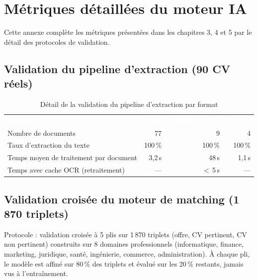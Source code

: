 \documentclass[12pt,a4paper]{report}
\begin{document}
\newpage

\appendix

\chapter{Métriques détaillées du moteur IA}

Cette annexe complète les métriques présentées dans les chapitres 3, 4 et 5 par le détail des protocoles de validation.

\section{Validation du pipeline d'extraction (90 CV réels)}

\begin{table}[H]
\centering
\caption{Détail de la validation du pipeline d'extraction par format}
\label{tab:annexe-extraction}
\small
\begin{tabularx}{\textwidth}{X r r r}
\rowcolor{tabheader}
\textcolor{white}{\textbf{Indicateur}} & \textcolor{white}{\textbf{PDF}} & \textcolor{white}{\textbf{Images (OCR)}} & \textcolor{white}{\textbf{DOCX}} \\
Nombre de documents & 77 & 9 & 4 \\
\rowcolor{tabalt}
Taux d'extraction du texte & 100\,\% & 100\,\% & 100\,\% \\
Temps moyen de traitement par document & 3,2\,s & 48\,s & 1,1\,s \\
\rowcolor{tabalt}
Temps avec cache OCR (retraitement) & --- & $<$\,5\,s & --- \\
\bottomrule
\end{tabularx}
\end{table}

\section{Validation croisée du moteur de matching (1\,870 triplets)}

Protocole : validation croisée à 5 plis sur 1\,870 triplets (offre, CV pertinent, CV non pertinent) construits sur 8 domaines professionnels (informatique, finance, marketing, juridique, santé, ingénierie, commerce, administration). À chaque pli, le modèle est affiné sur 80\,\% des triplets et évalué sur les 20\,\% restants, jamais vus à l'entraînement.
\end{document}
